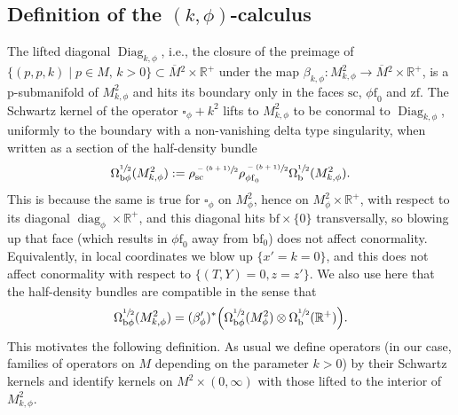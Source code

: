 \documentclass[11pt]{article}
\newcommand{\ie}{i.e.,\xspace}
\numberwithin{equation}{section}
\newcommand{\bphi}{{\bb\phi}}
\theoremstyle{plain}
\theoremstyle{definition}
\newcommand{\R}{{\mathbb{R}}}
\newcommand{\phif}{{\phi\mathrm{f}}}
\newcommand{\bb}{{\mathrm{b}}}
\newcommand{\bbf}{{\mathrm{bf}}}
\newcommand{\ssc}{{\mathrm{sc}}}
\newcommand{\zf}{{\mathrm{zf}}}
\DeclareMathOperator{\Diag}{Diag}
\DeclareMathOperator\diag{diag}
\newcommand{\Mbar}{{\overline{M}}}\let\M\Mbar
\begin{document}
\subsection{Definition of the $(k,\phi)$-calculus}\label{subsec:def psi k phi}
The lifted diagonal $\Diag_{k,\phi}$, \ie the closure of the preimage
of $\{(p,p,k)\mid p\in M,\, k>0\}\subset \Mbar{}^2\times\R^+$ under the map
$\beta_{k,\phi}:M^2_{k,\phi}\to \Mbar{}^2\times\R^+$,
is a p-submanifold of $M^2_{k,\phi}$ and hits its boundary only in the faces $\ssc$, $\phif_0$ and $\zf$.
The Schwartz kernel of the operator $\square_\phi+k^2$ lifts to $M^2_{k,\phi}$ to be conormal to
$\Diag_{k,\phi}$, uniformly to the boundary with a non-vanishing delta type singularity, when written as a section of the half-density bundle
\begin{equation}
\Omega^{\sfrac{1}{2}}_{\bphi}(M^{2}_{k, \phi}) := \rho_{\ssc}^{\sfrac{-(b+1)}{2}}
\rho_{\phif_0}^{\sfrac{-(b+1)}{2}} \Omega^{\sfrac12}_\bb(M^{2}_{k, \phi}).
\end{equation}
This is because the same is true for $\square_\phi$ on $M^2_\phi$, hence on $M^2_\phi\times\R^+$,
with respect to its diagonal $\diag_\phi\times\R^+$, and this diagonal hits $\bbf\times\{0\}$ transversally,
so blowing up that face (which results in $\phif_0$ away from $\bbf_0$) does not affect conormality.
Equivalently, in local coordinates we blow up $\{x'=k=0\}$, and this does not affect conormality with
respect to $\{(T,Y)=0,z=z'\}$. We also use here that the half-density bundles are compatible in the
sense that
\[
\Omega^{\sfrac12}_{\bphi}(M^2_{k,\phi}) =(\beta_\phi')^*\Bigl(\Omega^{\sfrac12}_{\bphi}(M^2_\phi)
\otimes\Omega^{\sfrac12}_\bb(\R^+)\Bigr).
\]
This motivates the following definition. As usual we define operators
(in our case, families of operators on $M$ depending on the parameter $k>0$)
by their Schwartz kernels and identify kernels on ${M}^2\times(0,\infty)$ with
those lifted to the interior of $M^2_{k,\phi}$.
\end{document}
